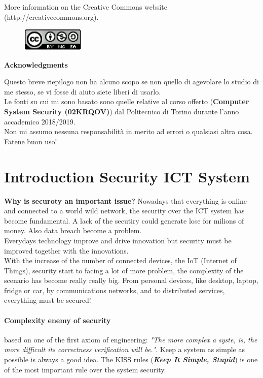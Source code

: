 \documentclass[12pt]{article}
\begin{document}
\noindent More information on the Creative Commons website (http://creativecommons.org).

\begin{figure}[h!]
  \centering
  \includegraphics[width=3cm]{images/license.png}
\end{figure}

{\noindent \Large \textbf{Acknowledgments}\bigskip}

Questo breve riepilogo non ha alcuno scopo se non quello di agevolare lo studio di me stesso, se vi fosse di aiuto siete liberi di usarlo.\\
Le fonti su cui mi sono basato sono quelle relative al corso offerto (\textbf{Computer System Security (02KRQOV)}) dal Politecnico di Torino durante l'anno accademico 2018/2019.\\
Non mi assumo nessuna responsabilità in merito ad errori o qualsiasi altra cosa. Fatene buon uso!
\newpage

\section{Introduction Security ICT System}
\textbf{Why is securoty an important issue?} Nowadays that everything is online and connected to a world wild network, the security over the ICT system has become fundamental. A lack of the secutiry could generate lose for milions of money. Also data breach become a problem.\\
Everydays technology improve and drive innovation but security must be improved together with the innovations.\\
With the increase of the number of connected devices, the IoT (Internet of Things), security start to facing a lot of more problem, the complexity of the scenario has become really really big. From personal devices, like desktop, laptop, fridge or car, by communications networks, and to distributed services, everything must be secured!\\
\paragraph{Complexity enemy of security} based on one of the first axiom of engineering: \textit{"The more complex a syste, is, the more difficult its correctness verification will be."}. Keep a system as simple as possible is always a good idea. The KISS rules (\textbf{\textit{Keep It Simple, Stupid}}) is one of the most important rule over the system security.
\end{document}
